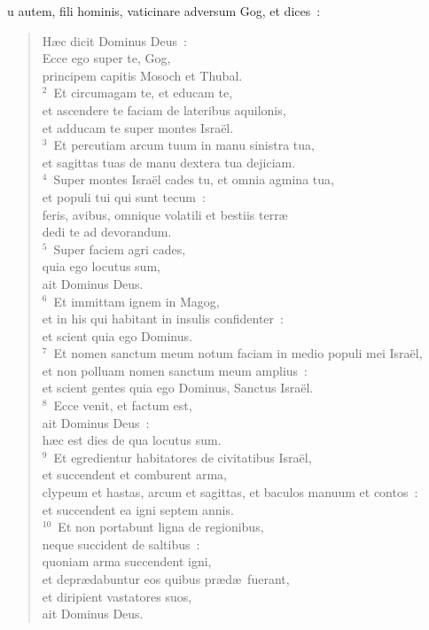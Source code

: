 \bchapter
{}u autem, fili hominis, vaticinare adversum Gog, et dices~: \begin{flushleft}\begin{verse}\vspace{6pt}H\ae c dicit Dominus Deus~:\\ Ecce ego super te, Gog,\\ principem capitis Mosoch et Thubal.\\
${}^{2}$~Et circumagam te, et educam te,\\ et ascendere te faciam de lateribus aquilonis,\\ et adducam te super montes Isra\"el.\\
${}^{3}$~Et percutiam arcum tuum in manu sinistra tua,\\ et sagittas tuas de manu dextera tua dejiciam.\\
${}^{4}$~Super montes Isra\"el cades tu, et omnia agmina tua,\\ et populi tui qui sunt tecum~:\\ feris, avibus, omnique volatili et bestiis terr\ae \\ dedi te ad devorandum.\\
${}^{5}$~Super faciem agri cades,\\ quia ego locutus sum,\\ ait Dominus Deus.\\
${}^{6}$~Et immittam ignem in Magog,\\ et in his qui habitant in insulis confidenter~:\\ et scient quia ego Dominus.\\
${}^{7}$~Et nomen sanctum meum notum faciam in medio populi mei Isra\"el,\\ et non polluam nomen sanctum meum amplius~:\\ et scient gentes quia ego Dominus, Sanctus Isra\"el.\\
${}^{8}$~Ecce venit, et factum est,\\ ait Dominus Deus~:\\ h\ae c est dies de qua locutus sum.\\
${}^{9}$~Et egredientur habitatores de civitatibus Isra\"el,\\ et succendent et comburent arma,\\ clypeum et hastas, arcum et sagittas, et baculos manuum et contos~:\\ et succendent ea igni septem annis.\\
${}^{10}$~Et non portabunt ligna de regionibus,\\ neque succident de saltibus~:\\ quoniam arma succendent igni,\\ et depr\ae dabuntur eos quibus pr\ae d\ae\ fuerant,\\ et diripient vastatores suos,\\ ait Dominus Deus.\end{verse}\end{flushleft}


